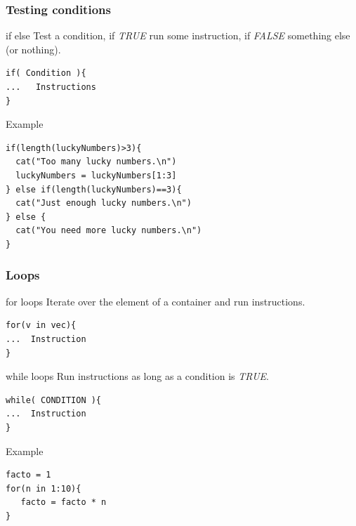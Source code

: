 \documentclass[10pt]{beamer}
\newenvironment{xframe}[2][]
  {\begin{frame}[fragile,environment=xframe,#1]
  \frametitle{#2}}
  {\end{frame}}
\begin{document}


\begin{xframe}{Testing conditions}
  \begin{block}{{\sf if else}}
    Test a condition, if {\it TRUE} run some instruction, if {\it FALSE} something else (or nothing).
\begin{verbatim}
if( Condition ){
...   Instructions
} 
\end{verbatim}  
  \end{block}
  \begin{exampleblock}{Example}
\begin{verbatim}
if(length(luckyNumbers)>3){
  cat("Too many lucky numbers.\n")
  luckyNumbers = luckyNumbers[1:3]
} else if(length(luckyNumbers)==3){
  cat("Just enough lucky numbers.\n")
} else {
  cat("You need more lucky numbers.\n")
}
\end{verbatim}  
  \end{exampleblock}
\end{xframe}

\begin{xframe}{Loops}
  \begin{block}{{\sf for} loops}
    Iterate over the element of a container and run instructions.
\begin{verbatim}
for(v in vec){
...  Instruction
}
\end{verbatim}  
  \end{block}
  \begin{block}{{\sf while} loops}
    Run instructions as long as a condition is {\it TRUE}.
\begin{verbatim}
while( CONDITION ){
...  Instruction
}
\end{verbatim}  
  \end{block}
  \begin{exampleblock}{Example}
\begin{verbatim}
facto = 1
for(n in 1:10){
   facto = facto * n
}
\end{verbatim}  
  \end{exampleblock}
\end{xframe}

\end{document}
